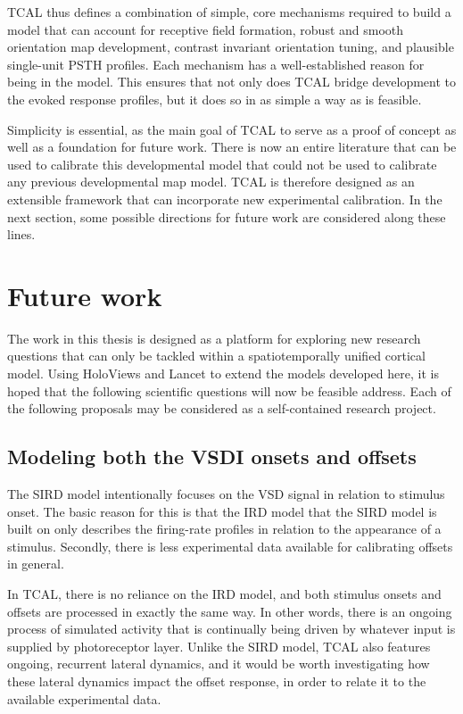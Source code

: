 \documentclass[phd,ianc,twoside]{infthesis}
\begin{document}
TCAL thus defines a combination of simple, core mechanisms required to build
a model that can account for receptive field formation, robust and
smooth orientation map development, contrast invariant orientation
tuning, and plausible single-unit PSTH profiles. Each mechanism has a
well-established reason for being in the model. This ensures that not
only does TCAL bridge development to the evoked response profiles, but it does
so in as simple a way as is feasible.

Simplicity is essential, as the main goal of TCAL to serve as a
proof of concept as well as a foundation for future work. There is now an
entire literature that can be used to calibrate this developmental
model that could not be used to calibrate any previous
developmental map model. TCAL is therefore designed as an extensible
framework that can incorporate new experimental calibration. In the next
section, some possible directions for future work are considered along these lines.

\section{Future work}
\label{section:future_work}

The work in this thesis is designed as a platform for exploring new
research questions that can only be tackled within a spatiotemporally
unified cortical model. Using HoloViews and Lancet to extend the
models developed here, it is hoped that the following scientific
questions will now be feasible address. Each of the following
proposals may be considered as a self-contained research project.

\subsection{Modeling both the VSDI onsets and offsets}
\label{section:future_SIRD_offsets}

The SIRD model intentionally focuses on the VSD signal in relation to
stimulus onset. The basic reason for this is that the IRD model that the SIRD
model is built on only describes the firing-rate profiles in relation to the appearance of
a stimulus. Secondly, there is less experimental data available for
calibrating offsets in general.

In TCAL, there is no reliance on the IRD model, and both stimulus onsets and offsets
are processed in exactly the same way. In other words, there
is an ongoing process of simulated activity that is continually being
driven by whatever input is supplied by photoreceptor layer. Unlike the
SIRD model, TCAL also features ongoing, recurrent lateral dynamics, and
it would be worth investigating how these lateral dynamics
impact the offset response, in order to relate it to the available experimental
data.
\end{document}
